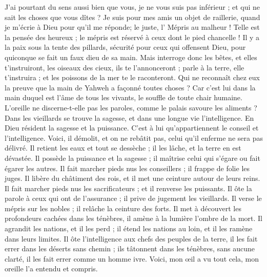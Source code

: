 \begin{multicols}{2}
J'ai pourtant du sens aussi bien que vous, je ne vous suis pas inférieur ; et qui ne sait les choses que vous dîtes ?
Je suis pour mes amis un objet de raillerie, quand je m'écrie à Dieu pour qu'il me réponde; le juste, l'
Mépris au malheur ! Telle est la pensée des heureux ; le mépris est réservé à ceux dont le pied chancelle !
Il y a la paix sous la tente des pillards, sécurité pour ceux qui offensent Dieu, pour quiconque se fait un faux dieu de sa main.
Mais interroge donc les bêtes, et elles t'instruiront, les oiseaux des cieux, ils te l'annonceront ;
parle à la terre, elle t'instruira ; et les poissons de la mer te le raconteront.
Qui ne reconnaît chez eux la preuve que la main de Yahweh a façonné toutes choses ?
Car c'est lui dans la main duquel est l'âme de tous les vivants, le souffle de toute chair humaine.
L'oreille ne discerne-t-elle pas les paroles, comme le palais savoure les aliments ?
Dans les vieillards se trouve la sagesse, et dans une longue vie l'intelligence.
En Dieu résident la sagesse et la puissance. C'est à lui qu'appartiennent le conseil et l'intelligence.
Voici, il démolit, et on ne rebâtit pas, celui qu'il enferme ne sera pas délivré.
Il retient les eaux et tout se dessèche ; il les lâche, et la terre en est dévastée.
Il possède la puissance et la sagesse ; il maîtrise celui qui s'égare ou fait égarer les autres.
Il fait marcher pieds nus les conseillers ; il frappe de folie les juges.
Il libère du châtiment des rois, et il met une ceinture autour de leurs reins.
Il fait marcher pieds nus les sacrificateurs ; et il renverse les puissants.
Il ôte la parole à ceux qui ont de l'assurance ; il prive de jugement les vieillards.
Il verse le mépris sur les nobles ; il relâche la ceinture des forts.
Il met à découvert les profondeurs cachées dans les ténèbres, il amène à la lumière l'ombre de la mort.
Il agrandit les nations, et il les perd ; il étend les nations au loin, et il les ramène dans leurs limites.
Il ôte l'intelligence aux chefs des peuples de la terre, il les fait errer dans les déserts sans chemin ;
ils tâtonnent dans les ténèbres, sans aucune clarté, il les fait errer comme un homme ivre.
\VerseOne{}Voici, mon œil a vu tout cela, mon oreille l'a entendu et compris.

\end{multicols}
